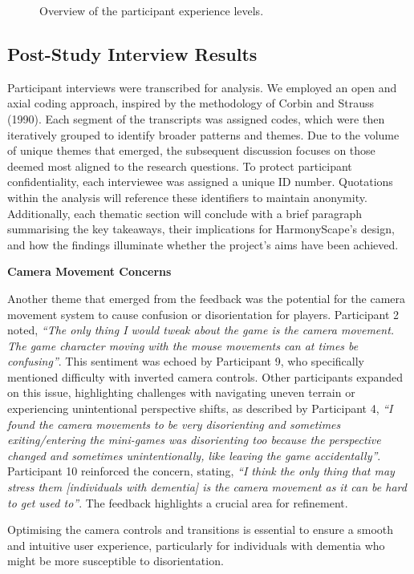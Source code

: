 \documentclass{l4proj}
\begin{document}
\begin{figure}[h]
  \caption{Overview of the participant experience levels.}  
  \label{fig:participant_experience} 
\end{figure}


\subsection{Post-Study Interview Results}
Participant interviews were transcribed for analysis. We employed an open and axial coding approach, inspired by the methodology of Corbin and Strauss (1990).  Each segment of the transcripts was assigned codes, which were then iteratively grouped to identify broader patterns and themes. Due to the volume of unique themes that emerged, the subsequent discussion focuses on those deemed most aligned to the research questions. To protect participant confidentiality, each interviewee was assigned a unique ID number. Quotations within the analysis will reference these identifiers to maintain anonymity. Additionally, each thematic section will conclude with a brief paragraph summarising the key takeaways, their implications for HarmonyScape's design, and how the findings illuminate whether the project's aims have been achieved.
\newline

\textbf{Camera Movement Concerns}

Another theme that emerged from the feedback was the potential for the camera movement system to cause confusion or disorientation for players. Participant 2 noted, \emph{“The only thing I would tweak about the game is the camera movement. The game character moving with the mouse movements can at times be confusing”}. This sentiment was echoed by Participant 9, who specifically mentioned difficulty with inverted camera controls. Other participants expanded on this issue, highlighting challenges with navigating uneven terrain or experiencing unintentional perspective shifts, as described by Participant 4, \emph{“I found the camera movements to be very disorienting and sometimes exiting/entering the mini-games was disorienting too because the perspective changed and sometimes unintentionally, like leaving the game accidentally”}. Participant 10 reinforced the concern, stating, \emph{“I think the only thing that may stress them [individuals with dementia] is the camera movement as it can be hard to get used to”}. The feedback highlights a crucial area for refinement. 

Optimising the camera controls and transitions is essential to ensure a smooth and intuitive user experience, particularly for individuals with dementia who might be more susceptible to disorientation.
\newline
\end{document}
